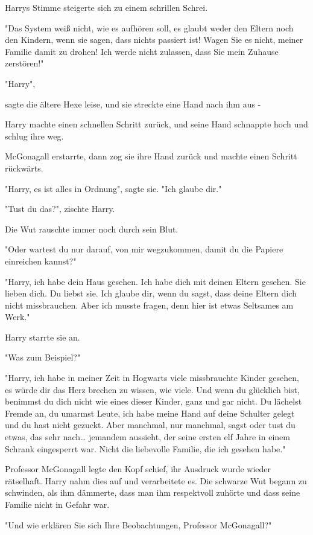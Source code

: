 {Harrys Stimme steigerte sich zu einem schrillen Schrei.

"Das System weiß nicht, wie es aufhören soll, es glaubt weder den Eltern noch den Kindern, wenn sie sagen, dass nichts passiert ist! Wagen Sie es nicht, meiner Familie damit zu drohen! Ich werde nicht zulassen, dass Sie mein Zuhause zerstören!"

"Harry",

sagte die ältere Hexe leise, und sie streckte eine Hand nach ihm aus -

Harry machte einen schnellen Schritt zurück, und seine Hand schnappte hoch und schlug ihre weg.

McGonagall erstarrte, dann zog sie ihre Hand zurück und machte einen Schritt rückwärts.

"Harry, es ist alles in Ordnung", sagte sie. "Ich glaube dir."

"Tust du das?", zischte Harry.

Die Wut rauschte immer noch durch sein Blut.

"Oder wartest du nur darauf, von mir wegzukommen, damit du die Papiere einreichen kannst?"

"Harry, ich habe dein Haus gesehen. Ich habe dich mit deinen Eltern gesehen. Sie lieben dich. Du liebst sie. Ich glaube dir, wenn du sagst, dass deine Eltern dich nicht missbrauchen. Aber ich musste fragen, denn hier ist etwas Seltsames am Werk."

Harry starrte sie an.

"Was zum Beispiel?"

"Harry, ich habe in meiner Zeit in Hogwarts viele missbrauchte Kinder gesehen, es würde dir das Herz brechen zu wissen, wie viele. Und wenn du glücklich bist, benimmst du dich nicht wie eines dieser Kinder, ganz und gar nicht. Du lächelst Fremde an, du umarmst Leute, ich habe meine Hand auf deine Schulter gelegt und du hast nicht gezuckt. Aber manchmal, nur manchmal, sagst oder tust du etwas, das sehr nach… jemandem aussieht, der seine ersten elf Jahre in einem Schrank eingesperrt war. Nicht die liebevolle Familie, die ich gesehen habe."

Professor McGonagall legte den Kopf schief, ihr Ausdruck wurde wieder rätselhaft. Harry nahm dies auf und verarbeitete es. Die schwarze Wut begann zu schwinden, als ihm dämmerte, dass man ihm respektvoll zuhörte und dass seine Familie nicht in Gefahr war.

"Und wie erklären Sie sich Ihre Beobachtungen, Professor McGonagall?"

}
